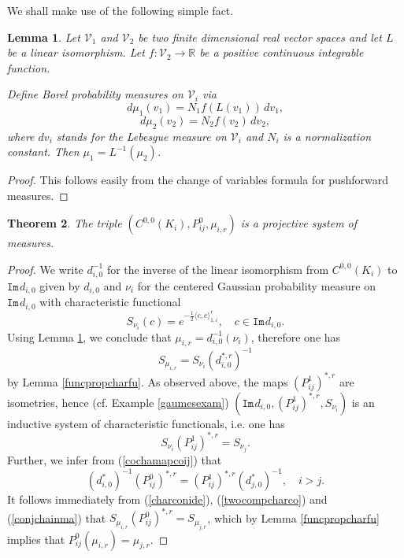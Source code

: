 \documentclass[11pt,reqno]{amsart}
\numberwithin{equation}{section}
\newtheorem{theorem}{Theorem}[section]
\newtheorem{lemma}[theorem]{Lemma}
\theoremstyle{remark}
\theoremstyle{rmdefinition}
\begin{document}
We shall make use of the following simple fact.
\begin{lemma}\label{chmeasulem}
Let $\mathcal{V}_1$ and $\mathcal{V}_2$ be two finite dimensional real vector spaces and let $L$ be a linear isomorphism. Let $f: \mathcal{V}_2 \to \mathbb{R}$ be a positive continuous integrable function.

Define Borel probability measures on $\mathcal{V}_i$
via 
\[ d\mu_1(v_1) = N_1 f(L(v_1)) \, dv_1, \]
\[ d\mu_2(v_2) = N_2 f(v_2) \, dv_2, \]
where $dv_i$ stands for the Lebesgue measure on $\mathcal{V}_i$ and $N_i$ is a normalization constant. Then $\mu_1 = L^{-1}(\mu_2)$.
\end{lemma}
\begin{proof}
This follows easily from the change of variables formula for pushforward measures.
\end{proof}
\begin{theorem}\label{mainprojsythe}
The triple $(C^{0,0}(K_i),P^0_{ij},\mu_{i,r})$ is a projective system of measures.
\end{theorem}
\begin{proof}
We write $d_{i,0}^{-1}$ for the inverse of the linear isomorphism from $C^{0,0}(K_i)$ to $\mathtt{Im}\hspace{1pt}d_{i,0}$ given by $d_{i,0}$ and $\nu_i$ for the centered Gaussian probability measure on $\mathtt{Im}\hspace{1pt}d_{i,0}$ with characteristic functional
$$S_{\nu_i} (c)=e^{-\frac{1}{2}\langle c, c \rangle_{1,i}^r},\quad c \in \mathtt{Im}\hspace{1pt}d_{i,0}.$$
Using Lemma \ref{chmeasulem}, we conclude that $\mu_{i,r}=d_{i,0}^{-1}(\nu_i)$, therefore one has
\begin{equation}\label{charconide}
S_{\mu_{i,r}} =S_{\nu_i}(d_{i,0}^{*,r})^{-1}
\end{equation}
by Lemma \ref{funcpropcharfu}. As observed above, the maps $(P^1_{ij})^{*,r}$ are isometries, hence (cf. Example \ref{gaumesexam}) $(\mathtt{Im}\hspace{1pt}d_{i,0},(P^1_{ij})^{*,r}, S_{\nu_i})$ is an inductive system of characteristic functionals, i.e. one has
\begin{equation}\label{twocompcharco}
	S_{\nu_{i}}(P^1_{ij})^{*,r} = S_{\nu_{j}}.
\end{equation}
Further, we infer from (\ref{cochamapcoij}) that
\begin{equation}\label{conjchainma}
(d_{i,0}^{*})^{-1}(P^0_{ij})^{*,r} 
= (P^1_{ij})^{*,r}(d_{j,0}^{*})^{-1}, \quad i>j.
\end{equation}
It follows immediately from (\ref{charconide}), (\ref{twocompcharco}) and (\ref{conjchainma}) that
$ S_{\mu_{i,r}}(P^0_{ij})^{*,r} = S_{\mu_{j,r}}$, which by Lemma \ref{funcpropcharfu} implies that 
$P^0_{ij}(\mu_{i,r})=\mu_{j,r}$.
\end{proof}
\end{document}
